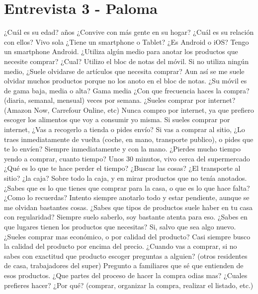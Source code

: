\section{Entrevista 3 - Paloma}
\begin{description}
    \preg ¿Cuál es su edad?
     años
    \preg ¿Convive con más gente en su hogar? ¿Cuál es su relación con ellos?
    \resp Vivo sola
    \preg ¿Tiene un smartphone o Tablet? ¿Es Android o iOS?
    \resp Tengo un smartphone Android.
    \preg ¿Utiliza algún medio para anotar los productos que necesite comprar? ¿Cual?
    \resp Utilizo el bloc de notas del móvil.
    \preg Si no utiliza ningún medio, ¿Suele olvidarse de artículos que necesita comprar?
    \resp Aun así se me suele olvidar muchos productos porque no los anoto en el bloc de notas.
    \preg ¿Su móvil es de gama baja, media o alta?
    \resp Gama media
    \preg ¿Con que frecuencia haces la compra? (diaria, semanal, mensual)
     veces por semana.
    \preg ¿Sueles comprar por internet? (Amazon Now, Carrefour Online, etc)
    \resp Nunca compro por internet, ya que prefiero escoger los alimentos que voy a consumir yo misma.
    \preg Si sueles comprar por internet, ¿Vas a recogerlo a tienda o pides envío?
    \resp 
    \preg Si vas a comprar al sitio, ¿Lo traes inmediatamente de vuelta (coche, en mano, transporte publico), o pides que te lo envíen?
    \resp Siempre inmediatamente y con la mano.
    \preg ¿Pierdes mucho tiempo yendo a comprar, cuanto tiempo?
    \resp Unos 30 minutos, vivo cerca del supermercado
    \preg ¿Qué es lo que te hace perder el tiempo? ¿Buscar las cosas? ¿El transporte al sitio? ¿la caja?
    \resp Sobre todo la caja, y en mirar productos que no tenía anotados.
    \preg ¿Sabes que es lo que tienes que comprar para la casa, o que es lo que hace falta? ¿Como lo recuerdas?
    \resp Intento siempre anotarlo todo y estar pendiente, aunque se me olvidan bastantes cosas.
    \preg ¿Sabes que tipos de productos suele haber en tu casa con regularidad?
    \resp Siempre suelo saberlo, soy bastante atenta para eso.
    \preg ¿Sabes en que lugares tienen los productos que necesitas?
    \resp Si, salvo que sea algo nuevo.
    \preg ¿Sueles comprar mas económico, o por calidad del producto?
    \resp Casi siempre busco la calidad del producto por encima del precio.
    \preg ¿Cuando vas a comprar, si no sabes con exactitud que producto escoger preguntas a alguien? (otros residentes de casa, trabajadores del super)
    \resp Pregunto a familiares que sé que entienden de esos productos.
    \preg ¿Que partes del proceso de hacer la compra odias mas? ¿Cuales prefieres hacer? ¿Por qué? (comprar, organizar la compra, realizar el listado, etc.)

\end{description}
